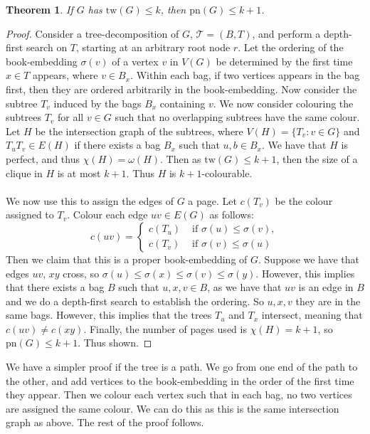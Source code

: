 \documentclass[]{report}
\newcommand{\tree}{\mathcal{T}}
\newcommand{\tw}{\text{tw}}
\newcommand{\pn}{\text{pn}}
\newtheorem{theorem}{Theorem}
\theoremstyle{definition}
\numberwithin{theorem}{section}
\numberwithin{equation}{section}
\begin{document}
\begin{theorem}
	If $G$ has $\tw(G) \leq k$, then $\pn(G) \leq k + 1$. 
\end{theorem}
\begin{proof}
	Consider a tree-decomposition of $G$, $\tree = (B, T)$, and perform a depth-first search on $T$, starting at an arbitrary root node $r$. Let the ordering of the book-embedding $\sigma(v)$ of a vertex $v$ in $V(G)$ be determined by the first time $x \in T$ appears, where $v \in B_x$. Within each bag, if two vertices appears in the bag first, then they are ordered arbitrarily in the book-embedding. Now consider the subtree $T_v$ induced by the bags $B_x$ containing $v$. We now consider colouring the subtrees $T_v$ for all $v \in G$ such that no overlapping subtrees have the same colour. Let $H$ be the intersection graph of the subtrees, where $V(H) = \lbrace T_v : v \in G \rbrace$ and $T_u T_v \in E(H)$ if there exists a bag $B_x$ such that $u, b \in B_x$. We have that $H$ is perfect, and thus $\chi(H) = \omega(H)$. Then as $\tw(G) \leq k + 1$, then the size of a clique in $H$ is at most $k + 1$. Thus $H$ is $k + 1$-colourable.
	\paragraph{}
	We now use this to assign the edges of $G$ a page. Let $c(T_v)$ be the colour assigned to $T_v$. Colour each edge $uv \in E(G)$ as follows:
	\begin{equation}
		c(uv) = 
		\begin{cases}
			c(T_u) &\text{ if } \sigma(u) \leq \sigma(v),\\
			c(T_v) &\text{ if } \sigma(v) \leq \sigma(u)
		\end{cases}
	\end{equation}
	Then we claim that this is a proper book-embedding of $G$. Suppose we have that edges $uv$, $xy$ cross, so $\sigma(u) \leq \sigma(x) \leq \sigma(v) \leq \sigma(y)$. However, this implies that there exists a bag $B$ such that $u, x, v \in B$, as we have that $uv$ is an edge in $B$ and we do a depth-first search to establish the ordering. So $u, x, v$ they are in the same bags. However, this implies that the trees $T_u$ and $T_x$ intersect, meaning that $c(uv) \neq c(xy)$. Finally, the number of pages used is $\chi(H) = k + 1$, so $\pn(G) \leq k + 1$. Thus shown.
\end{proof}

We have a simpler proof if the tree is a path. We go from one end of the path to the other, and add vertices to the book-embedding in the order of the first time they appear. Then we colour each vertex such that in each bag, no two vertices are assigned the same colour. We can do this as this is the same intersection graph as above. The rest of the proof follows.
\end{document}
